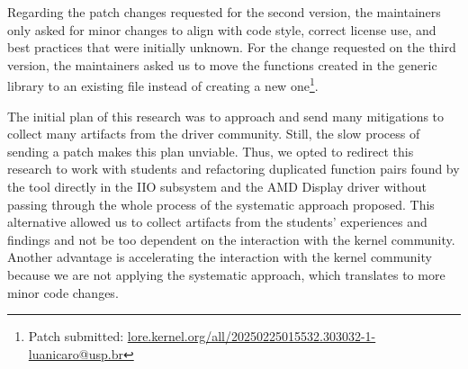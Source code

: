 Regarding the patch changes requested for the second version, the maintainers 
only asked for minor changes to align with code style, correct license use, 
and best practices that were initially unknown. For the change requested on 
the third version, the maintainers asked us to move the functions created in 
the generic library to an existing file instead of creating a new one\footnote{Patch submitted: \href{https://lore.kernel.org/all/20250225015532.303032-1-luanicaro@usp.br/}{lore.kernel.org/all/20250225015532.303032-1-luanicaro@usp.br}}.

The initial plan of this research was to approach and send many mitigations to collect 
many artifacts from the driver community. Still, the slow process of sending a patch 
makes this plan unviable. Thus, we opted to redirect this research to work with students 
and refactoring duplicated function pairs found by the tool directly in the IIO subsystem and the 
AMD Display driver without passing through the whole process of the systematic approach 
proposed. This alternative allowed us to collect artifacts from the students' experiences 
and findings and not be too dependent on the interaction with the kernel community. 
Another advantage is accelerating the interaction with the kernel community because we are 
not applying the systematic approach, which translates to more minor code changes.
